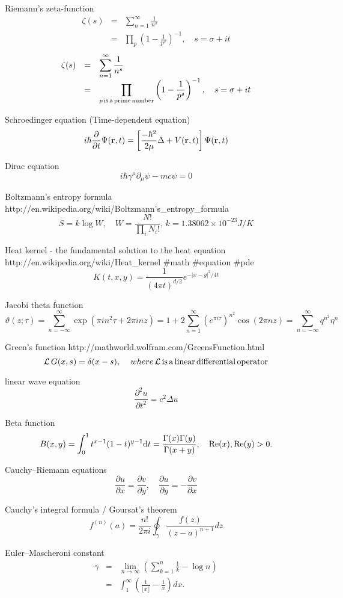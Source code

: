 Riemann's zeta-function
$$
\begin{array}{lll}
\zeta(s)&=&\displaystyle \sum^\infty_{n=1}\frac{1}{n^s} \\
&=& \displaystyle \prod_{p}\left(1-\frac{1}{p^s}\right)^{-1},\quad s=\sigma+i t
\end{array}
$$
$$
\begin{array}{lll}
\zeta(s)&=&\displaystyle \sum^\infty_{n=1}\frac{1}{n^s} \\
&=& \displaystyle \prod_{p {\rm \, is \, a \, prime \, number}}\left(1-\frac{1}{p^s}\right)^{-1},\quad s=\sigma+i t
\end{array}
$$


Schroedinger equation (Time-dependent equation)
$$
i \hbar \frac{\partial}{\partial t}\Psi({\bf r},t)=\left[\frac{-\hbar^2}{2\mu}\Delta+V({\bf r},t)\right]\Psi({\bf r},t)
$$

Dirac equation
$$
i \hbar \gamma^\mu\partial_\mu\psi-mc\psi=0
$$

Boltzmann's entropy formula
http://en.wikipedia.org/wiki/Boltzmann's_entropy_formula
$$
S=k\log W, \quad W=\frac{N!}{\displaystyle\prod_i N_i!}, \, k=1.38062 \times 10^{-23} J/K
$$

Heat kernel - the fundamental solution to the heat equation http://en.wikipedia.org/wiki/Heat_kernel #math #equation #pde
$$
K(t,x,y)=\frac{1}{(4\pi t)^{d/2}}e^{-|x-y|^2/4t}
$$

Jacobi theta function 
$$
\vartheta(z;\tau)=\sum^\infty_{n=-\infty}\exp(\pi i n^2\tau+2\pi i n z)=1+2\sum^\infty_{n=1}(e^{\pi i \tau})^{n^2}\cos(2\pi n z)=\sum^\infty_{n=-\infty}q^{n^2}\eta^n
$$

Green’s function
http://mathworld.wolfram.com/GreensFunction.html
$$
{\cal L}\,G(x,s)=\delta(x-s), \quad\,{where}\, {\cal L}\,{\rm is}\,{\rm a}\,{\rm linear}\,{\rm differential}\,{\rm operator }
$$

linear wave equation
$$
\frac{\partial^2 u}{\partial t^2}=c^2 \Delta u
$$

Beta function
$$
B(x,y)=\int^1_0 t^{x-1}(1-t)^{y-1}{\rm d}t=\frac{\Gamma(x)\Gamma(y)}{\Gamma(x+y)}, \quad {\rm Re}(x),{\rm Re}(y)>0.
$$


Cauchy–Riemann equations 
$$
\frac{\partial u}{\partial x}=\frac{\partial v}{\partial y}, \quad \frac{\partial u}{\partial y}=-\frac{\partial v}{\partial x}
$$

Cauchy's integral formula / Goursat's theorem
$$
\displaystyle f^{(n)}(a)=\frac{n!}{2\pi i}\oint_\gamma \frac{f(z)}{(z-a)^{n+1}}dz
$$

Euler–Mascheroni constant
$$
\begin{array}{lll}
\displaystyle \gamma &=& \displaystyle  \lim_{n\rightarrow\infty}\displaystyle \left(\sum^n_{k=1}\frac{1}{k}-\log n\right) \\
&=& \displaystyle \int^\infty_1 \left(\frac{1}{\lfloor x \rfloor}-\frac{1}{x}\right)dx.
\end{array}
$$

